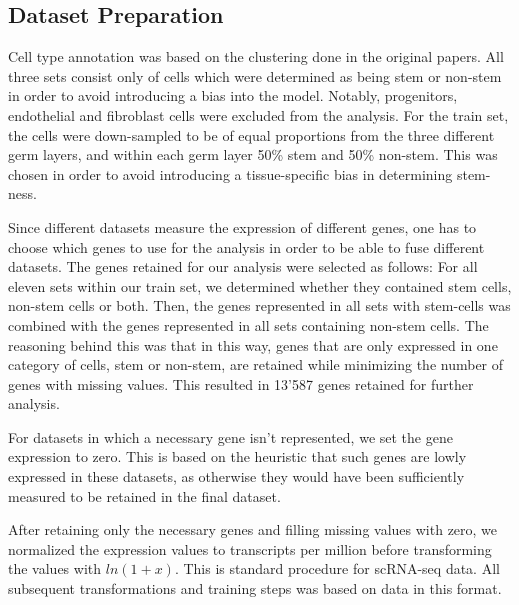 \documentclass[10pt,conference,compsocconf]{IEEEtran}
\begin{document}
\subsection{Dataset Preparation}
Cell type annotation was based on the clustering done in the original papers. All three sets consist only of cells which were determined as being stem or non-stem in order to avoid introducing a bias into the model. Notably, progenitors, endothelial and fibroblast cells were excluded from the analysis. For the train set, the cells were down-sampled to be of equal proportions from the three different germ layers, and within each germ layer 50\% stem and 50\% non-stem. This was chosen in order to avoid introducing a tissue-specific bias in determining stem-ness. 
\par
Since different datasets measure the expression of different genes, one has to choose which genes to use for the analysis in order to be able to fuse different datasets. The genes retained for our analysis were selected as follows: For all eleven sets within our train set, we determined whether they contained stem cells, non-stem cells or both. Then, the genes represented in all sets with stem-cells was combined with the genes represented in all sets containing non-stem cells. The reasoning behind this was that in this way, genes that are only expressed in one category of cells, stem or non-stem, are retained while minimizing the number of genes with missing values. This resulted in 13'587 genes retained for further analysis.
\par
For datasets in which a necessary gene isn't represented, we set the gene expression to zero. This is based on the heuristic that such genes are lowly expressed in these datasets, as otherwise they would have been sufficiently measured to be retained in the final dataset. 
\par
After retaining only the necessary genes and filling missing values with zero, we normalized the expression values to transcripts per million before transforming the values with $ln(1+x)$. This is standard procedure for scRNA-seq data. All subsequent transformations and training steps was based on data in this format. 
\end{document}
